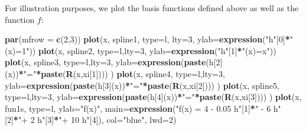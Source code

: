 \documentclass[
]{book}
\newenvironment{Shaded}{\begin{snugshade}}{\end{snugshade}}
\newcommand{\AttributeTok}[1]{\textcolor[rgb]{0.13,0.29,0.53}{#1}}
\newcommand{\DecValTok}[1]{\textcolor[rgb]{0.00,0.00,0.81}{#1}}
\newcommand{\FunctionTok}[1]{\textcolor[rgb]{0.13,0.29,0.53}{\textbf{#1}}}
\newcommand{\NormalTok}[1]{#1}
\newcommand{\SpecialCharTok}[1]{\textcolor[rgb]{0.81,0.36,0.00}{\textbf{#1}}}
\newcommand{\StringTok}[1]{\textcolor[rgb]{0.31,0.60,0.02}{#1}}
\begin{document}
For illustration purposes, we plot the basis functions defined above as well as the function \(f\):

\begin{Shaded}
\begin{Highlighting}[]
\FunctionTok{par}\NormalTok{(}\AttributeTok{mfrow =} \FunctionTok{c}\NormalTok{(}\DecValTok{2}\NormalTok{,}\DecValTok{3}\NormalTok{))}
\FunctionTok{plot}\NormalTok{(x, spline1, }\AttributeTok{type=}\StringTok{\textquotesingle{}l\textquotesingle{}}\NormalTok{, }\AttributeTok{lty=}\DecValTok{3}\NormalTok{, }\AttributeTok{ylab=}\FunctionTok{expression}\NormalTok{(}\StringTok{"h"}\NormalTok{[}\DecValTok{0}\NormalTok{]}\SpecialCharTok{*}\StringTok{"(x)=1"}\NormalTok{))}
\FunctionTok{plot}\NormalTok{(x, spline2, }\AttributeTok{type=}\StringTok{\textquotesingle{}l\textquotesingle{}}\NormalTok{,}\AttributeTok{lty=}\DecValTok{3}\NormalTok{, }\AttributeTok{ylab=}\FunctionTok{expression}\NormalTok{(}\StringTok{"h"}\NormalTok{[}\DecValTok{1}\NormalTok{]}\SpecialCharTok{*}\StringTok{"(x)=x"}\NormalTok{))}
\FunctionTok{plot}\NormalTok{(x, spline3, }\AttributeTok{type=}\StringTok{\textquotesingle{}l\textquotesingle{}}\NormalTok{,}\AttributeTok{lty=}\DecValTok{3}\NormalTok{, }\AttributeTok{ylab=}\FunctionTok{expression}\NormalTok{(}\FunctionTok{paste}\NormalTok{(h[}\DecValTok{2}\NormalTok{](x))}\SpecialCharTok{*}\StringTok{"="}\SpecialCharTok{*}\FunctionTok{paste}\NormalTok{(}\FunctionTok{R}\NormalTok{(x,xi[}\DecValTok{1}\NormalTok{])))  )}
\FunctionTok{plot}\NormalTok{(x, spline4, }\AttributeTok{type=}\StringTok{\textquotesingle{}l\textquotesingle{}}\NormalTok{,}\AttributeTok{lty=}\DecValTok{3}\NormalTok{, }\AttributeTok{ylab=}\FunctionTok{expression}\NormalTok{(}\FunctionTok{paste}\NormalTok{(h[}\DecValTok{3}\NormalTok{](x))}\SpecialCharTok{*}\StringTok{"="}\SpecialCharTok{*}\FunctionTok{paste}\NormalTok{(}\FunctionTok{R}\NormalTok{(x,xi[}\DecValTok{2}\NormalTok{])))  )}
\FunctionTok{plot}\NormalTok{(x, spline5, }\AttributeTok{type=}\StringTok{\textquotesingle{}l\textquotesingle{}}\NormalTok{,}\AttributeTok{lty=}\DecValTok{3}\NormalTok{, }\AttributeTok{ylab=}\FunctionTok{expression}\NormalTok{(}\FunctionTok{paste}\NormalTok{(h[}\DecValTok{4}\NormalTok{](x))}\SpecialCharTok{*}\StringTok{"="}\SpecialCharTok{*}\FunctionTok{paste}\NormalTok{(}\FunctionTok{R}\NormalTok{(x,xi[}\DecValTok{3}\NormalTok{])))  )}
\FunctionTok{plot}\NormalTok{(x, fun1s, }\AttributeTok{type=}\StringTok{\textquotesingle{}l\textquotesingle{}}\NormalTok{, }\AttributeTok{ylab=}\StringTok{"f(x)"}\NormalTok{, }\AttributeTok{main=}\FunctionTok{expression}\NormalTok{(}\StringTok{"f(x) =  4 {-} 0.05 h"}\NormalTok{[}\DecValTok{1}\NormalTok{]}\SpecialCharTok{*}\StringTok{" {-} 6 h"}\NormalTok{[}\DecValTok{2}\NormalTok{]}\SpecialCharTok{*}\StringTok{"+ 2 h"}\NormalTok{[}\DecValTok{3}\NormalTok{]}\SpecialCharTok{*}\StringTok{"+ 10 h"}\NormalTok{[}\DecValTok{4}\NormalTok{]), }\AttributeTok{col=}\StringTok{"blue"}\NormalTok{, }\AttributeTok{lwd=}\DecValTok{2}\NormalTok{)}
\end{Highlighting}
\end{Shaded}
\end{document}

